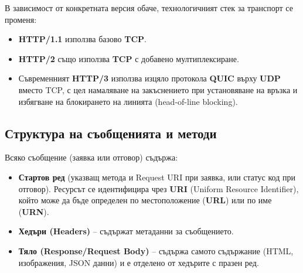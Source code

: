 \documentclass{scrartcl}
\begin{document}
\begin{FlushLeft}
В зависимост от конкретната версия обаче, технологичният стек за транспорт се променя:
\begin{itemize}
    \item \textbf{HTTP/1.1} използва базово \textbf{TCP}.
    \item \textbf{HTTP/2} също използва \textbf{TCP} с добавено мултиплексиране.
    \item Съвременният \textbf{HTTP/3} използва изцяло протокола \textbf{QUIC} върху \textbf{UDP} вместо TCP, с цел намаляване на закъснението при установяване на връзка и избягване на блокирането на линията (head-of-line blocking).
\end{itemize}

\subsection{Структура на съобщенията и методи}
Всяко съобщение (заявка или отговор) съдържа:
\begin{itemize}
    \item \textbf{Стартов ред} (указващ метода и Request URI при заявка, или статус код при отговор). Ресурсът се идентифицира чрез \textbf{URI} (Uniform Resource Identifier), който може да бъде определен по местоположение (\textbf{URL}) или по име (\textbf{URN}).
    \item \textbf{Хедъри (Headers)} – съдържат метаданни за съобщението.
    \item \textbf{Тяло (Response/Request Body)} – съдържа самото съдържание (HTML, изображения, JSON данни) и е отделено от хедърите с празен ред.
\end{itemize}


\end{FlushLeft}
\end{document}
